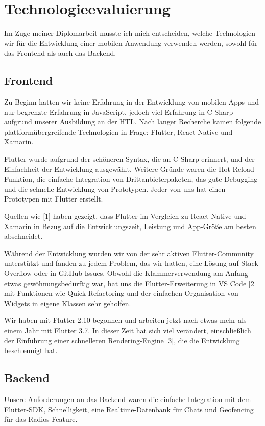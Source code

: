 \section{Technologieevaluierung}

Im Zuge meiner Diplomarbeit musste ich mich entscheiden, welche Technologien wir für die Entwicklung einer mobilen Anwendung verwenden werden, sowohl für das Frontend als auch das Backend.

\subsection{Frontend}

Zu Beginn hatten wir keine Erfahrung in der Entwicklung von mobilen Apps und nur begrenzte Erfahrung in JavaScript, jedoch viel Erfahrung in C-Sharp aufgrund unserer Ausbildung an der HTL. Nach langer Recherche kamen folgende plattformübergreifende Technologien in Frage: Flutter, React Native und Xamarin.

Flutter wurde aufgrund der schöneren Syntax, die an C-Sharp erinnert, und der Einfachheit der Entwicklung ausgewählt. Weitere Gründe waren die Hot-Reload-Funktion, die einfache Integration von Drittanbieterpaketen, das gute Debugging und die schnelle Entwicklung von Prototypen. Jeder von uns hat einen Prototypen mit Flutter erstellt.

Quellen wie [1] haben gezeigt, dass Flutter im Vergleich zu React Native und Xamarin in Bezug auf die Entwicklungszeit, Leistung und App-Größe am besten abschneidet.

Während der Entwicklung wurden wir von der sehr aktiven Flutter-Community unterstützt und fanden zu jedem Problem, das wir hatten, eine Lösung auf Stack Overflow oder in GitHub-Issues. Obwohl die Klammerverwendung am Anfang etwas gewöhnungsbedürftig war, hat uns die Flutter-Erweiterung in VS Code [2] mit Funktionen wie Quick Refactoring und der einfachen Organisation von Widgets in eigene Klassen sehr geholfen.

Wir haben mit Flutter 2.10 begonnen und arbeiten jetzt nach etwas mehr als einem Jahr mit Flutter 3.7. In dieser Zeit hat sich viel verändert, einschließlich der Einführung einer schnelleren Rendering-Engine [3], die die Entwicklung beschleunigt hat.

\subsection{Backend}

Unsere Anforderungen an das Backend waren die einfache Integration mit dem Flutter-SDK, Schnelligkeit, eine Realtime-Datenbank für Chats und Geofencing für das Radios-Feature.

